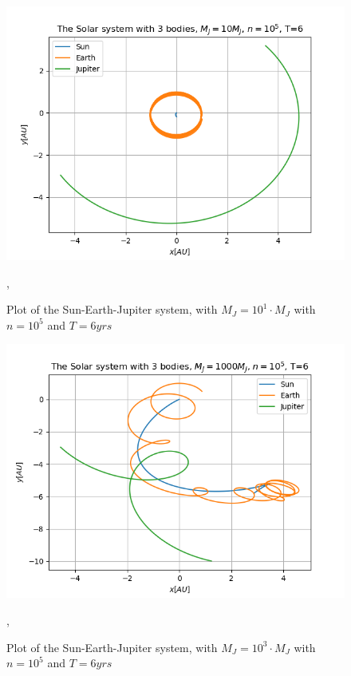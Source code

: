 \documentclass[%
oneside,                 %
final,                   %
10pt]{article}
\begin{document}
\begin{figure}[!htb]
        \centering 
         \includegraphics[scale=.6]{../Results/OOthreeBodyEarthSun10Jupiterj5T6.png} 
        \caption{Plot of the Sun-Earth-Jupiter system, with $M_J=10^1 \cdot M_J$ with $n=10^5$ and $T=6 yrs$},
        \label{fig:ESJm10}   
\end{figure}  
\begin{figure}[!htb]
        \centering 
         \includegraphics[scale=.6]{../Results/OOthreeBodyEarthSun1000Jupiterj5T6.png} 
        \caption{Plot of the Sun-Earth-Jupiter system, with $M_J=10^3 \cdot M_J$ with $n=10^5$ and $T=6 yrs$},
        \label{fig:ESJm1000}   
\end{figure}  
\end{document}
